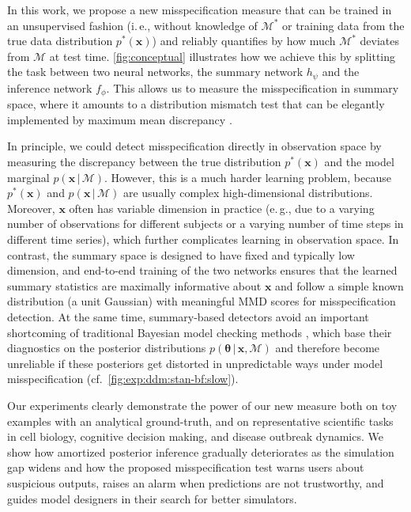 \documentclass[twoside,11pt]{article}
\newcommand{\x}{\boldsymbol{x}}
\newcommand{\thetab}{\boldsymbol{\theta}}
\newcommand{\0}{\boldsymbol{0}}
\newcommand{\given}{\,|\,}
\newcommand{\ie}{i.\,e.}
\newcommand{\eg}{e.\,g.}
\begin{document}
In this work, we propose a new misspecification measure that can be trained in an unsupervised fashion (\ie, without knowledge of $\mathcal{M}^*$ or training data from the true data distribution $p^*(\x)$) and reliably quantifies by how much $\mathcal{M}^*$ deviates from $\mathcal{M}$ at test time.
\autoref{fig:conceptual} illustrates how we achieve this by splitting the task between two neural networks, the summary network $h_\psi$ and the inference network $f_\phi$.
This allows us to measure the misspecification in summary space, where it amounts to a distribution mismatch test that can be elegantly implemented by maximum mean discrepancy \citep[MMD;][]{Gretton2012}.

In principle, we could detect misspecification directly in observation space by measuring the discrepancy between the true distribution $p^*(\x)$ and the model marginal $p(\x\given\mathcal{M})$.
However, this is a much harder learning problem, because $p^*(\x)$ and $p(\x\given\mathcal{M})$ are usually complex high-dimensional distributions.
Moreover, $\x$ often has variable dimension in practice (\eg, due to a varying number of observations for different subjects or a varying number of time steps in different time series), which further complicates learning in observation space.
In contrast, the summary space is designed to have fixed and typically low dimension, and end-to-end training of the two networks ensures that the learned summary statistics are maximally informative about $\x$ and follow a simple known distribution (a unit Gaussian) with meaningful MMD scores for misspecification detection.
At the same time, summary-based detectors avoid an important shortcoming of traditional Bayesian model checking methods \citep[e.g.,][]{bayes_ppc}, which base their diagnostics on the posterior distributions $p(\thetab\given\x,\mathcal{M})$ and therefore become unreliable if these posteriors get distorted in unpredictable ways under model misspecification (cf.\ \autoref{fig:exp:ddm:stan-bf:slow}).

Our experiments clearly demonstrate the power of our new measure both on toy examples with an analytical ground-truth, and on representative scientific tasks in cell biology, cognitive decision making, and disease outbreak dynamics.
We show how amortized posterior inference gradually deteriorates as the simulation gap widens and how the proposed misspecification test warns users about suspicious outputs, raises an alarm when predictions are not trustworthy, and guides model designers in their search for better simulators.
\end{document}
